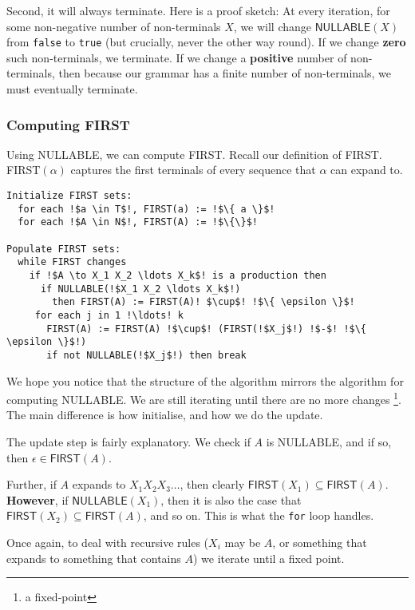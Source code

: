 Second, it will always terminate. Here is a proof sketch: At every iteration, for some non-negative number of non-terminals $X$, we will change $\textsf{NULLABLE}(X)$ from \texttt{false} to \texttt{true} (but crucially, never the other way round). If we change \textbf{zero} such non-terminals, we terminate. If we change a \textbf{positive} number of non-terminals, then because our grammar has a finite number of non-terminals, we must eventually terminate.

\subsubsection{Computing FIRST}
Using \textsf{NULLABLE}, we can compute \textsf{FIRST}. Recall our definition of \textsf{FIRST}. \textsf{FIRST}$(\alpha)$ captures the first terminals of every sequence that $\alpha$ can expand to.

\begin{lstlisting}[style=pseudocode]
Initialize FIRST sets:
  for each !$a \in T$!, FIRST(a) := !$\{ a \}$! 
  for each !$A \in N$!, FIRST(A) := !$\{\}$! 

Populate FIRST sets:
  while FIRST changes 
    if !$A \to X_1 X_2 \ldots X_k$! is a production then 
      if NULLABLE(!$X_1 X_2 \ldots X_k$!)
        then FIRST(A) := FIRST(A)! $\cup$! !$\{ \epsilon \}$!
     for each j in 1 !\ldots! k 
       FIRST(A) := FIRST(A) !$\cup$! (FIRST(!$X_j$!) !$-$! !$\{ \epsilon \}$!) 
       if not NULLABLE(!$X_j$!) then break 
\end{lstlisting}

We hope you notice that the structure of the algorithm mirrors the algorithm for computing \textsf{NULLABLE}. We are still iterating until there are no more changes \footnote{a fixed-point}. The main difference is how initialise, and how we do the update. 

The update step is fairly explanatory. We check if $A$ is \textsf{NULLABLE}, and if so, then $\epsilon \in \textsf{FIRST}(A)$. 

Further, if $A$ expands to $X_1X_2X_3\ldots$, then clearly $\textsf{FIRST}(X_1) \subseteq \textsf{FIRST}(A)$. \textbf{However}, if $\textsf{NULLABLE}(X_1)$, then it is also the case that $\textsf{FIRST}(X_2) \subseteq \textsf{FIRST}(A)$, and so on. This is what the \texttt{for} loop handles.

Once again, to deal with recursive rules ($X_i$ may be $A$, or something that expands to something that contains $A$) we iterate until a fixed point.

